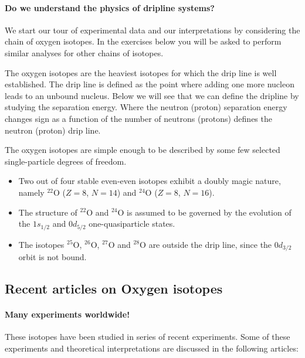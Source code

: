 \documentclass[%
twoside,                 %
final,                   %
10pt]{article}
\begin{document}
\paragraph{Do we understand the physics of dripline systems?}

We start our tour of experimental data and our interpretations by considering the chain of oxygen isotopes. In the exercises below you will be asked to perform similar analyses for other chains of isotopes.

The oxygen isotopes are the heaviest isotopes for which the drip line is well established.  The drip line is defined as the point where adding one more nucleon leads to an unbound nucleus. Below we will see that we can define the dripline by studying the separation energy. Where the neutron (proton) separation energy changes sign as a function of the number of neutrons (protons) defines the neutron (proton) drip line.

The oxygen isotopes are simple enough to be described by some few selected single-particle degrees of freedom.  

\begin{itemize}
\item Two out of four stable even-even isotopes exhibit a doubly magic nature, namely ${}^{22}\mbox{O}$ ($Z=8$, $N=14$) and ${}^{24}\mbox{O}$ ($Z=8$, $N=16$).

\item The structure of ${}^{22}\mbox{O}$ and ${}^{24}\mbox{O}$ is assumed to be governed by the evolution of the $1s_{1/2}$ and $0d_{5/2}$  one-quasiparticle states.

\item The isotopes ${}^{25}\mbox{O}$, ${}^{26}\mbox{O}$, ${}^{27}\mbox{O}$ and ${}^{28}\mbox{O}$ are outside the drip line, since the $0d_{3/2}$ orbit is not bound.
\end{itemize}

\noindent




\subsection*{Recent articles on Oxygen isotopes}

\paragraph{Many experiments worldwide!}
These isotopes have been studied in series of recent experiments. Some of these experiments and theoretical interpretations are discussed in the following articles:
\end{document}

